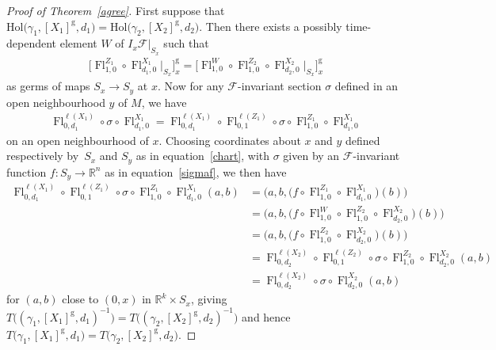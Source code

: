 \documentclass[pdftex]{sigma}
\numberwithin{equation}{section}
\def\g{\operatorname{g}}
\def\Fl{\operatorname{Fl}}
\def\FF{{\mathcal{F}}}
\def\RB{{\mathbb{R}}}
\begin{document}
\begin{proof}[Proof of Theorem~\ref{agree}]
First suppose that $\text{Hol}\big(\gamma_{1},[X_{1}]^{\g},d_{1}\big) = \text{Hol}\big(\gamma_{2},[X_{2}]^{\g},d_{2}\big)$. Then there exists a possibly time-dependent element $W$ of $I_{x}\FF|_{S_{x}}$ such that
\begin{gather*}
\big[\Fl^{Z_{1}}_{1,0}\circ\Fl^{X_{1}}_{d_{1},0}\big|_{S_{x}}\big]^{\g}_{x} = \big[\Fl^{W}_{1,0}\circ\Fl^{Z_{2}}_{1,0}\circ\Fl^{X_{2}}_{d_{2},0}\big|_{S_{x}}\big]^{\g}_{x}
\end{gather*}
as germs of maps $S_{x}\rightarrow S_{y}$ at $x$. Now for any $\FF$-invariant section $\sigma$ defined in an open neighbourhood $y$ of $M$, we have
\begin{gather*}
\Fl^{\ell(X_{1})}_{0,d_{1}}\circ\sigma\circ\Fl^{X_{1}}_{d_{1},0} = \Fl^{\ell(X_{1})}_{0,d_{1}}\circ\Fl^{\ell(Z_{1})}_{0,1}\circ\sigma\circ\Fl^{Z_{1}}_{1,0}\circ\Fl^{X_{1}}_{d_{1},0}
\end{gather*}
on an open neighbourhood of $x$. Choosing coordinates about $x$ and $y$ defined respectively by~$S_{x}$ and $S_{y}$ as in equation~\eqref{chart}, with $\sigma$ given by an $\FF$-invariant function $f\colon S_{y}\rightarrow\RB^{n}$ as in equation~\eqref{sigmaf}, we then have
\begin{align*}
\Fl^{\ell(X_{1})}_{0,d_{1}}\circ\Fl^{\ell(Z_{1})}_{0,1}\circ\sigma\circ\Fl^{Z_{1}}_{1,0} \circ\Fl^{X_{1}}_{d_{1},0}(a,b) &= \big(a,b,\big(f\circ\Fl^{Z_{1}}_{1,0}\circ\Fl^{X_{1}}_{d_{1},0}\big)(b)\big)
\\
&= \big(a,b,\big(f\circ\Fl^{W}_{1,0}\circ\Fl^{Z_{2}}_{1,0}\circ\Fl^{X_{2}}_{d_{2},0}\big)(b)\big)
\\
&= \big(a,b,\big(f\circ\Fl^{Z_{2}}_{1,0}\circ\Fl^{X_{2}}_{d_{2},0}\big)(b)\big)
\\
&=\Fl^{\ell(X_{2})}_{0,d_{2}}\circ\Fl^{\ell(Z_{2})}_{0,1}\circ\sigma\circ\Fl^{Z_{2}}_{1,0} \circ\Fl^{X_{2}}_{d_{2},0}(a,b)
\\
&= \Fl^{\ell(X_{2})}_{0,d_{2}}\circ\sigma\circ\Fl^{X_{2}}_{d_{2},0}(a,b)
\end{align*}
for $(a,b)$ close to $(0,x)$ in $\RB^{k}\times S_{x}$, giving $T\big((\gamma_{1},[X_{1}]^{\g},d_{1})^{-1}\big) = T\big((\gamma_{2},[X_{2}]^{\g},d_{2})^{-1}\big)$ and hence $T\big(\gamma_{1},[X_{1}]^{\g},d_{1}\big) = T\big(\gamma_{2},[X_{2}]^{\g},d_{2}\big)$.


\end{proof}
\end{document}
